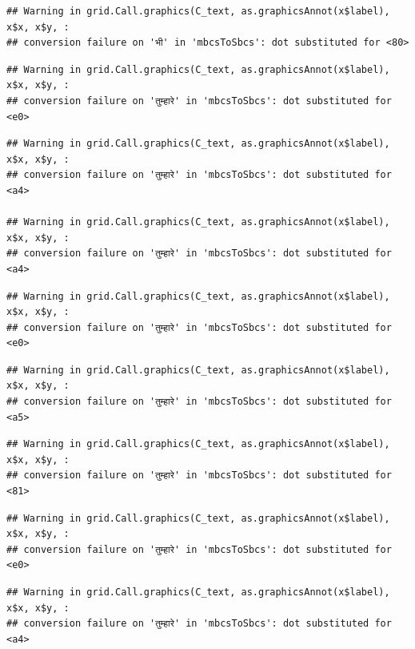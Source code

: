 \documentclass[
]{article}
\begin{document}
\begin{verbatim}
## Warning in grid.Call.graphics(C_text, as.graphicsAnnot(x$label), x$x, x$y, :
## conversion failure on 'भी' in 'mbcsToSbcs': dot substituted for <80>
\end{verbatim}

\begin{verbatim}
## Warning in grid.Call.graphics(C_text, as.graphicsAnnot(x$label), x$x, x$y, :
## conversion failure on 'तुम्हारे' in 'mbcsToSbcs': dot substituted for <e0>
\end{verbatim}

\begin{verbatim}
## Warning in grid.Call.graphics(C_text, as.graphicsAnnot(x$label), x$x, x$y, :
## conversion failure on 'तुम्हारे' in 'mbcsToSbcs': dot substituted for <a4>

## Warning in grid.Call.graphics(C_text, as.graphicsAnnot(x$label), x$x, x$y, :
## conversion failure on 'तुम्हारे' in 'mbcsToSbcs': dot substituted for <a4>
\end{verbatim}

\begin{verbatim}
## Warning in grid.Call.graphics(C_text, as.graphicsAnnot(x$label), x$x, x$y, :
## conversion failure on 'तुम्हारे' in 'mbcsToSbcs': dot substituted for <e0>
\end{verbatim}

\begin{verbatim}
## Warning in grid.Call.graphics(C_text, as.graphicsAnnot(x$label), x$x, x$y, :
## conversion failure on 'तुम्हारे' in 'mbcsToSbcs': dot substituted for <a5>
\end{verbatim}

\begin{verbatim}
## Warning in grid.Call.graphics(C_text, as.graphicsAnnot(x$label), x$x, x$y, :
## conversion failure on 'तुम्हारे' in 'mbcsToSbcs': dot substituted for <81>
\end{verbatim}

\begin{verbatim}
## Warning in grid.Call.graphics(C_text, as.graphicsAnnot(x$label), x$x, x$y, :
## conversion failure on 'तुम्हारे' in 'mbcsToSbcs': dot substituted for <e0>
\end{verbatim}

\begin{verbatim}
## Warning in grid.Call.graphics(C_text, as.graphicsAnnot(x$label), x$x, x$y, :
## conversion failure on 'तुम्हारे' in 'mbcsToSbcs': dot substituted for <a4>
\end{verbatim}
\end{document}
